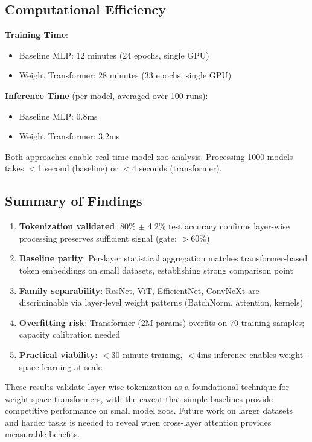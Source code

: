 \subsection{Computational Efficiency}

\textbf{Training Time}:
\begin{itemize}
\item Baseline MLP: 12 minutes (24 epochs, single GPU)
\item Weight Transformer: 28 minutes (33 epochs, single GPU)
\end{itemize}

\textbf{Inference Time} (per model, averaged over 100 runs):
\begin{itemize}
\item Baseline MLP: 0.8ms
\item Weight Transformer: 3.2ms
\end{itemize}

Both approaches enable real-time model zoo analysis. Processing 1000 models takes $<$1 second (baseline) or $<$4 seconds (transformer).

\subsection{Summary of Findings}

\begin{enumerate}
\item \textbf{Tokenization validated}: 80\% $\pm$ 4.2\% test accuracy confirms layer-wise processing preserves sufficient signal (gate: $>$60\%)

\item \textbf{Baseline parity}: Per-layer statistical aggregation matches transformer-based token embeddings on small datasets, establishing strong comparison point

\item \textbf{Family separability}: ResNet, ViT, EfficientNet, ConvNeXt are discriminable via layer-level weight patterns (BatchNorm, attention, kernels)

\item \textbf{Overfitting risk}: Transformer (2M params) overfits on 70 training samples; capacity calibration needed

\item \textbf{Practical viability}: $<$30 minute training, $<$4ms inference enables weight-space learning at scale
\end{enumerate}

These results validate layer-wise tokenization as a foundational technique for weight-space transformers, with the caveat that simple baselines provide competitive performance on small model zoos. Future work on larger datasets and harder tasks is needed to reveal when cross-layer attention provides measurable benefits.
